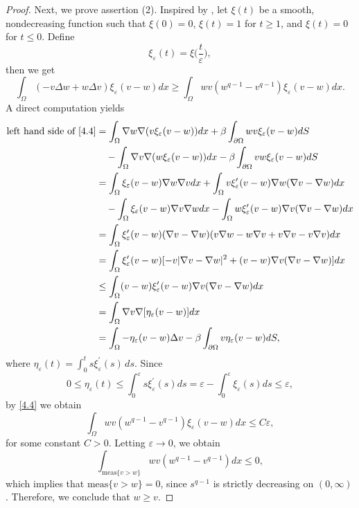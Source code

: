 \documentclass[12pt,reqno]{amsart}
\numberwithin{equation}{section}
\theoremstyle{definition}
\begin{document}
\begin{proof}
Next, we prove assertion (2). Inspired by \cite{BK}, let $\xi(t)$ be a smooth, nondecreasing function such that $\xi(0)=0$, $\xi(t)=1$ for $t\ge1$, and $\xi(t)=0$ for $t\le 0$. Define 
$$
\xi_\varepsilon(t)=\xi\Big(\frac{t}{\varepsilon} \Big),
$$
then we get 
\begin{equation}\label{4.4}
\int_{\Omega}(-v\Delta w+w\Delta v)\xi_\varepsilon(v-w)dx\ge \int_{\Omega}wv(w^{q-1}-v^{q-1})\xi_\varepsilon(v-w)dx.
\end{equation}
A direct computation yields
\begin{align*}
\text{left hand side of \eqref{4.4}}&=\int_{\Omega}\nabla w\nabla (v\xi_\varepsilon(v-w))dx+\beta\int_{\partial\Omega}wv\xi_\varepsilon(v-w)dS\\
&\quad-\int_{\Omega}\nabla v\nabla (w\xi_\varepsilon(v-w))dx-\beta\int_{\partial\Omega}vw\xi_\varepsilon(v-w)dS\\
&=\int_{\Omega}\xi_\varepsilon(v-w)\nabla w\nabla vdx+\int_{\Omega}v\xi_\varepsilon^{\prime}(v-w)\nabla w(\nabla v-\nabla w)dx\\
&\quad-\int_{\Omega}\xi_\varepsilon(v-w)\nabla v\nabla wdx-\int_{\Omega}w\xi_\varepsilon^\prime(v-w)\nabla v(\nabla v-\nabla w)dx\\
&=\int_{\Omega}\xi_{\varepsilon}^{\prime}(v-w)(\nabla v-\nabla w)(v\nabla w-w\nabla v+v\nabla v-v\nabla v)dx\\
&=\int_{\Omega}\xi_{\varepsilon}^{\prime}(v-w)[-v|\nabla v-\nabla w|^2+(v-w)\nabla v(\nabla v-\nabla w)]dx\\
&\le\int_{\Omega}(v-w)\xi_{\varepsilon}^{\prime}(v-w)\nabla v(\nabla v-\nabla w)dx\\
&=\int_{\Omega}\nabla v\nabla [\eta_\varepsilon(v-w)]dx\\
&=\int_{\Omega}-\eta_\varepsilon(v-w)\Delta v-\beta\int_{\partial\Omega}v\eta_\varepsilon(v-w)dS,
\end{align*}
where $\eta_\varepsilon(t)=\int_0^ts\xi^\prime_\varepsilon(s) \, ds$. Since 
$$
0\le \eta_\varepsilon(t)\le \int_0^\varepsilon s\xi^\prime_\varepsilon(s)ds=\varepsilon-\int_0^\varepsilon\xi_\varepsilon(s)ds\le \varepsilon,
$$
by \eqref{4.4} we obtain 
$$
\int_{\Omega}wv(w^{q-1}-v^{q-1})\xi_\varepsilon(v-w)dx\le C\varepsilon,
$$
for some constant $C>0$. Letting $\varepsilon\to0$, we obtain 
$$
\int_{\text{meas}\{v>w\}}wv(w^{q-1}-v^{q-1})dx\le 0,
$$
which implies that $\text{meas}\{v>w\}=0$, since $s^{q-1}$ is strictly decreasing on $(0,\infty)$. Therefore, we conclude that $w\ge v$.
\end{proof}
\end{document}
